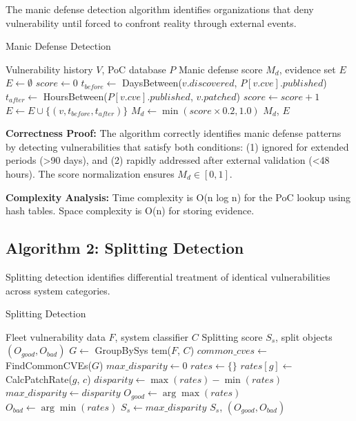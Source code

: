 \documentclass[11pt,a4paper]{article}
\begin{document}
The manic defense detection algorithm identifies organizations that deny vulnerability until forced to confront reality through external events.

\begin{algorithm}
\caption{Manic Defense Detection}
\label{alg:manic}
\begin{algorithmic}[1]
\REQUIRE Vulnerability history $V$, PoC database $P$
\ENSURE Manic defense score $M_d$, evidence set $E$
\STATE $E \leftarrow \emptyset$
\STATE $score \leftarrow 0$
        \STATE $t_{before} \leftarrow$ DaysBetween($v.discovered$, $P[v.cve].published$)
        \STATE $t_{after} \leftarrow$ HoursBetween($P[v.cve].published$, $v.patched$)
            \STATE $score \leftarrow score + 1$
            \STATE $E \leftarrow E \cup \{(v, t_{before}, t_{after})\}$
        \ENDIF
    \ENDIF
\ENDFOR
\STATE $M_d \leftarrow \min(score \times 0.2, 1.0)$
\RETURN $M_d$, $E$
\end{algorithmic}
\end{algorithm}

\textbf{Correctness Proof:}
The algorithm correctly identifies manic defense patterns by detecting vulnerabilities that satisfy both conditions: (1) ignored for extended periods (>90 days), and (2) rapidly addressed after external validation (<48 hours). The score normalization ensures $M_d \in [0, 1]$.

\textbf{Complexity Analysis:}
Time complexity is O(n log n) for the PoC lookup using hash tables. Space complexity is O(n) for storing evidence.

\subsection{Algorithm 2: Splitting Detection}

Splitting detection identifies differential treatment of identical vulnerabilities across system categories.

\begin{algorithm}
\caption{Splitting Detection}
\label{alg:splitting}
\begin{algorithmic}[1]
\REQUIRE Fleet vulnerability data $F$, system classifier $C$
\ENSURE Splitting score $S_s$, split objects $(O_{good}, O_{bad})$
\STATE $G \leftarrow$ GroupBySys tem($F$, $C$)
\STATE $common\_cves \leftarrow$ FindCommonCVEs($G$)
\STATE $max\_disparity \leftarrow 0$
    \STATE $rates \leftarrow \{\}$
        \STATE $rates[g] \leftarrow$ CalcPatchRate($g$, $c$)
    \ENDFOR
    \STATE $disparity \leftarrow \max(rates) - \min(rates)$
        \STATE $max\_disparity \leftarrow disparity$
        \STATE $O_{good} \leftarrow \arg\max(rates)$
        \STATE $O_{bad} \leftarrow \arg\min(rates)$
    \ENDIF
\ENDFOR
\STATE $S_s \leftarrow max\_disparity$
\RETURN $S_s$, $(O_{good}, O_{bad})$
\end{algorithmic}
\end{algorithm}
\end{document}

